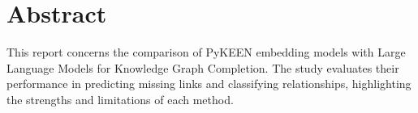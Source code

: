 \section*{Abstract}


This report concerns the comparison of PyKEEN embedding models with Large Language Models for Knowledge Graph Completion. The study evaluates their performance in predicting missing links and classifying relationships, highlighting the strengths and limitations of each method.
